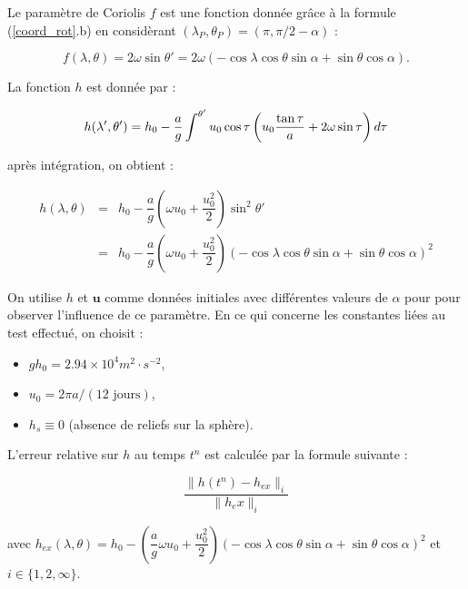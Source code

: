Le paramètre de Coriolis $f$ est une fonction donnée grâce à la formule (\ref{coord_rot}.b) en considèrant $(\lambda_P, \theta_P) = (\pi, \pi/2 - \alpha)$ :

\begin{equation}
f (\lambda, \theta) = 2 \omega \sin \theta' = 2 \omega \left( - \cos \lambda \cos \theta \sin \alpha + \sin \theta \cos \alpha \right).
\end{equation}

La fonction $h$ est donnée par :

\begin{equation}
h(\lambda', \theta') = h_0 - \dfrac{a}{g} \displaystyle\int^{\theta'} u_0 \cos \tau \left( u_0 \dfrac{\tan \tau}{a} + 2 \omega \sin \tau \right) d \tau
\end{equation}

après intégration, on obtient :

\begin{equation}
\begin{array}{rcl}
h(\lambda, \theta) & = & h_0 - \dfrac{a}{g} \left( \omega u_0 + \dfrac{u_0^2}{2} \right) \sin^2 \theta' \\
                   & = & h_0 - \dfrac{a}{g} \left( \omega u_0 + \dfrac{u_0^2}{2} \right) \left( - \cos \lambda \cos \theta \sin \alpha + \sin \theta \cos \alpha \right)^2
\end{array}
\label{eq: williamson 2 initial height}
\end{equation}

On utilise $h$ et $\mathbf{u}$ comme données initiales avec différentes valeurs de $\alpha$ pour pour observer l'influence de ce paramètre. En ce qui concerne les constantes liées au test effectué, on choisit :
\begin{itemize}
\item $g h_0= 2.94 \times 10^4 m^2 \cdot s^{-2}$,
\item $u_0= 2 \pi a / (12 \text{ jours})$,
\item $h_s \equiv 0$ (absence de reliefs sur la sphère).
\end{itemize}

L'erreur relative sur $h$ au temps $t^n$ est calculée par la formule suivante :

\begin{equation}
\dfrac{\| h(t^n) - h_{ex}\|_i}{\| h_ex \|_i}
\end{equation}

avec $h_{ex}(\lambda, \theta) = h_0 - \left( \dfrac{a}{g} \omega u_0 + \dfrac{u_0^2}{2} \right) \left( - \cos \lambda \cos \theta \sin \alpha + \sin \theta \cos \alpha \right)^2$ et $i \in \lbrace 1,2,\infty \rbrace$.

